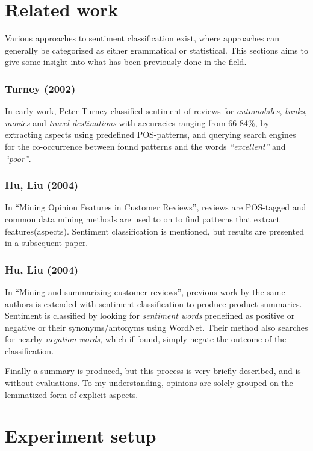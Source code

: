 \documentclass[a4paper,11pt]{kth-mag}
\begin{document}
\newpage
\section{Related work}
Various approaches to sentiment classification exist, where approaches can generally be categorized as either grammatical\cite{todo} or statistical\cite{todo}. This sections aims to give some insight into what has been previously done in the field.

\subsubsection{Turney (2002)}
In early work, Peter Turney classified sentiment of reviews for \emph{automobiles}, \emph{banks}, \emph{movies} and \emph{travel destinations} with accuracies ranging from 66-84\%, by extracting aspects using predefined POS-patterns, and querying search engines for the co-occurrence between found patterns and the words \emph{``excellent''} and \emph{``poor''}.

\subsubsection{Hu, Liu (2004)}
In ``Mining Opinion Features in Customer Reviews'', reviews are POS-tagged and common data mining methods are used to on to find patterns that extract features(aspects). Sentiment classification is mentioned, but results are presented in a subsequent paper.

\subsubsection{Hu, Liu (2004)}
In ``Mining and summarizing customer reviews'', previous work by the same authors is extended with sentiment classification to produce product summaries. Sentiment is classified by looking for \emph{sentiment words} predefined as positive or negative or their synonyms/antonyms using WordNet. Their method also searches for nearby \emph{negation words}, which if found, simply negate the outcome of the classification.

Finally a summary is produced, but this process is very briefly described, and is without evaluations. To my understanding, opinions are solely grouped on the lemmatized form of explicit aspects.


\pagebreak
\section{Experiment setup}
\end{document}
